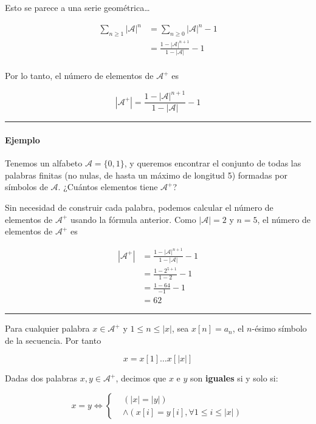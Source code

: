 Esto se parece a una serie geométrica\ldots{}


\begin{align*}
\sum_{n\geq 1}|\mathcal{A}|^n&=\sum_{n\geq 0}|\mathcal{A}|^n - 1\\
&=\frac{1-|\mathcal{A}|^{n+1}}{1-|\mathcal{A}|} - 1\\
\end{align*}


Por lo tanto, el número de elementos de \(\mathcal{A}^+\) es

\[
|\mathcal{A}^+|=\frac{1-|\mathcal{A}|^{n+1}}{1-|\mathcal{A}|} - 1
\]

\begin{center}\rule{0.5\linewidth}{0.5pt}\end{center}

\paragraph{Ejemplo}\label{ejemplo-1}

Tenemos un alfabeto \(\mathcal{A}=\{0,1\}\), y queremos encontrar el
conjunto de todas las palabras finitas (no nulas, de hasta un máximo de
longitud 5) formadas por símbolos de \(\mathcal{A}\). ¿Cuántos elementos
tiene \(\mathcal{A}^+\)?

Sin necesidad de construir cada palabra, podemos calcular el número de
elementos de \(\mathcal{A}^+\) usando la fórmula anterior. Como
\(|\mathcal{A}|=2\) y \(n=5\), el número de elementos de
\(\mathcal{A}^+\) es


\begin{align*}
|\mathcal{A}^+|&=\frac{1-|\mathcal{A}|^{n+1}}{1-|\mathcal{A}|} - 1\\
&=\frac{1-2^{5+1}}{1-2} - 1\\
&=\frac{1-64}{-1} - 1\\
&=62
\end{align*}


\begin{center}\rule{0.5\linewidth}{0.5pt}\end{center}

Para cualquier palabra \(x\in\mathcal{A}^+\) y \(1\leq n\leq|x|\), sea
\(x[n]=a_n\), el \(n\)-ésimo símbolo de la secuencia. Por tanto

\[
x=x[1]\dots x[|x|]
\]

Dadas dos palabras \(x,y\in\mathcal{A}^+\), decimos que \(x\) e \(y\)
son \textbf{iguales} si y solo si:

\[
x = y \Leftrightarrow\begin{cases}
&\left(|x|=|y|\right)\\
&\wedge\left(x[i]=y[i], \forall 1\leq i\leq|x|\right)
\end{cases}
\]

